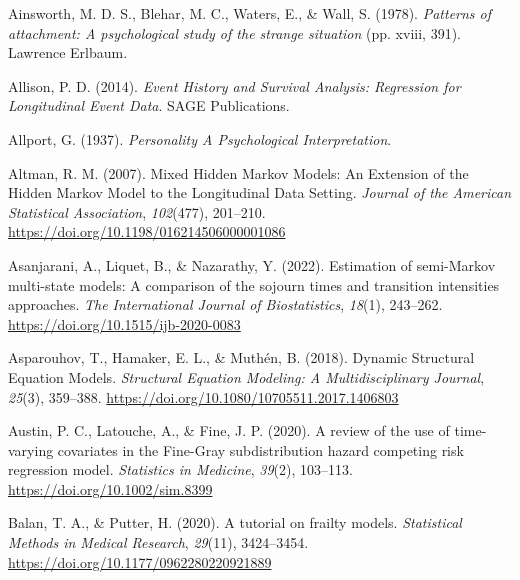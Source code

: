 \documentclass[12pt]{./styles/outhesis}
\begin{document}
\leavevmode{}%
Ainsworth, M. D. S., Blehar, M. C., Waters, E., \& Wall, S. (1978).
\emph{Patterns of attachment: {A} psychological study of the strange
situation} (pp. xviii, 391). Lawrence Erlbaum.

\leavevmode{}%
Allison, P. D. (2014). \emph{Event {History} and {Survival Analysis}:
{Regression} for {Longitudinal Event Data}}. SAGE Publications.

\leavevmode{}%
Allport, G. (1937). \emph{Personality {A Psychological Interpretation}}.

\leavevmode{}%
Altman, R. M. (2007). Mixed {Hidden Markov Models}: {An Extension} of
the {Hidden Markov Model} to the {Longitudinal Data Setting}.
\emph{Journal of the American Statistical Association}, \emph{102}(477),
201--210. \url{https://doi.org/10.1198/016214506000001086}

\leavevmode{}%
Asanjarani, A., Liquet, B., \& Nazarathy, Y. (2022). Estimation of
semi-{Markov} multi-state models: A comparison of the sojourn times and
transition intensities approaches. \emph{The International Journal of
Biostatistics}, \emph{18}(1), 243--262.
\url{https://doi.org/10.1515/ijb-2020-0083}

\leavevmode{}%
Asparouhov, T., Hamaker, E. L., \& Muthén, B. (2018). Dynamic
{Structural Equation Models}. \emph{Structural Equation Modeling: A
Multidisciplinary Journal}, \emph{25}(3), 359--388.
\url{https://doi.org/10.1080/10705511.2017.1406803}

\leavevmode{}%
Austin, P. C., Latouche, A., \& Fine, J. P. (2020). A review of the use
of time-varying covariates in the {Fine}-{Gray} subdistribution hazard
competing risk regression model. \emph{Statistics in Medicine},
\emph{39}(2), 103--113. \url{https://doi.org/10.1002/sim.8399}

\leavevmode{}%
Balan, T. A., \& Putter, H. (2020). A tutorial on frailty models.
\emph{Statistical Methods in Medical Research}, \emph{29}(11),
3424--3454. \url{https://doi.org/10.1177/0962280220921889}
\end{document}
